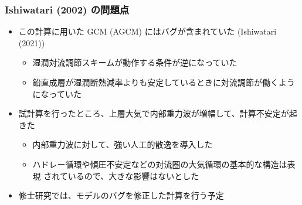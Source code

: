 \documentclass[aspectratio=149,9pt,fleqn]{beamer}
\begin{document}
\begin{frame}
	\frametitle{Ishiwatari \etal (2002) の問題点}
	\begin{itemize}
		\item この計算に用いた GCM (AGCM) にはバグが含まれていた (Ishiwatari \etal (2021))
			\begin{itemize}
				\item 湿潤対流調節スキームが動作する条件が逆になっていた
				\item 鉛直成層が湿潤断熱減率よりも安定しているときに対流調節が働くようになっていた
			\end{itemize}
		\item 試計算を行ったところ、上層大気で内部重力波が増幅して、計算不安定が起きた
			\begin{itemize}
				\item 内部重力波に対して、強い人工的散逸を導入した
				\item ハドレー循環や傾圧不安定などの対流圏の大気循環の基本的な構造は表現
					されているので、大きな影響はないとした
			\end{itemize}
		\item 修士研究では、モデルのバグを修正した計算を行う予定
	\end{itemize}
\end{frame}
\end{document}
